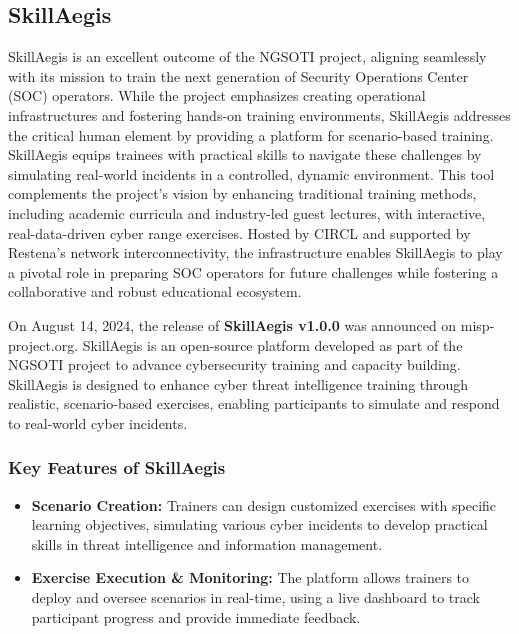 \subsection{SkillAegis}
SkillAegis is an excellent outcome of the NGSOTI project, aligning seamlessly with its mission to train the next generation of Security Operations Center (SOC) operators. While the project emphasizes creating operational infrastructures and fostering hands-on training environments, SkillAegis addresses the critical human element by providing a platform for scenario-based training.
SkillAegis equips trainees with practical skills to navigate these challenges by simulating real-world incidents in a controlled, dynamic environment.
This tool complements the project's vision by enhancing traditional training methods, including academic curricula and industry-led guest lectures, with interactive, real-data-driven cyber range exercises. Hosted by CIRCL and supported by Restena's network interconnectivity, the infrastructure enables SkillAegis to play a pivotal role in preparing SOC operators for future challenges while fostering a collaborative and robust educational ecosystem.

On August 14, 2024, the release of \textbf{SkillAegis v1.0.0} was announced on misp-project.org. SkillAegis is an open-source platform developed as part of the NGSOTI project to advance cybersecurity training and capacity building. SkillAegis is designed to enhance cyber threat intelligence training through realistic, scenario-based exercises, enabling participants to simulate and respond to real-world cyber incidents.

\subsubsection{Key Features of SkillAegis}
\begin{itemize}
	\item \textbf{Scenario Creation:} Trainers can design customized exercises with specific learning objectives, simulating various cyber incidents to develop practical skills in threat intelligence and information management.
	\item \textbf{Exercise Execution \& Monitoring:} The platform allows trainers to deploy and oversee scenarios in real-time, using a live dashboard to track participant progress and provide immediate feedback.
\end{itemize}

